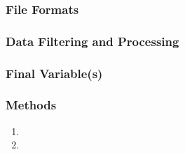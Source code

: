 





\subsubsection*{File Formats} 

\subsubsection*{Data Filtering and Processing}

\subsubsection*{Final Variable(s)}

\subsubsection*{Methods}

\begin{enumerate}
\item 
\item
\end{enumerate}

